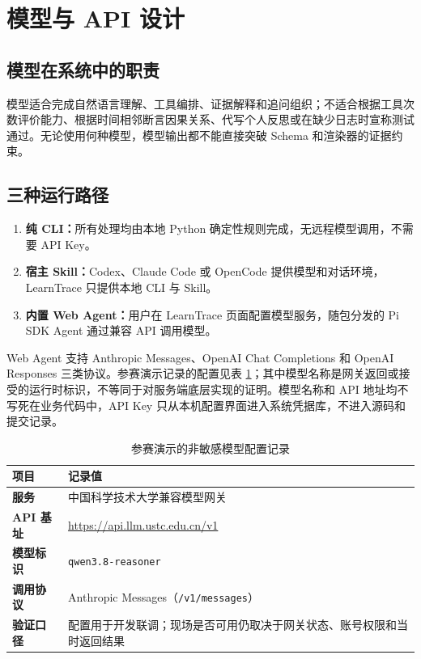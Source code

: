\documentclass[UTF8,a4paper,12pt]{ctexart}
\begin{document}
\section{模型与 API 设计}

\subsection{模型在系统中的职责}

模型适合完成自然语言理解、工具编排、证据解释和追问组织；不适合根据工具次数评价能力、根据时间相邻断言因果关系、代写个人反思或在缺少日志时宣称测试通过。无论使用何种模型，模型输出都不能直接突破 Schema 和渲染器的证据约束。

\subsection{三种运行路径}

\begin{enumerate}
  \item \textbf{纯 CLI：}所有处理均由本地 Python 确定性规则完成，无远程模型调用，不需要 API Key。
  \item \textbf{宿主 Skill：}Codex、Claude Code 或 OpenCode 提供模型和对话环境，LearnTrace 只提供本地 CLI 与 Skill。
  \item \textbf{内置 Web Agent：}用户在 LearnTrace 页面配置模型服务，随包分发的 Pi SDK Agent 通过兼容 API 调用模型。
\end{enumerate}

Web Agent 支持 Anthropic Messages、OpenAI Chat Completions 和 OpenAI Responses 三类协议。参赛演示记录的配置见表 \ref{tab:model-config}；其中模型名称是网关返回或接受的运行时标识，不等同于对服务端底层实现的证明。模型名称和 API 地址均不写死在业务代码中，API Key 只从本机配置界面进入系统凭据库，不进入源码和提交记录。

\begin{table}[h]
\centering
\small
\caption{参赛演示的非敏感模型配置记录}
\label{tab:model-config}
\begin{tabularx}{0.94\textwidth}{>{\bfseries}p{}X}
\toprule
项目 & 记录值 \\
\midrule
服务 & 中国科学技术大学兼容模型网关 \\
API 基址 & \url{https://api.llm.ustc.edu.cn/v1} \\
模型标识 & \texttt{qwen3.8-reasoner} \\
调用协议 & Anthropic Messages（\texttt{/v1/messages}） \\
验证口径 & 配置用于开发联调；现场是否可用仍取决于网关状态、账号权限和当时返回结果 \\
\bottomrule
\end{tabularx}
\end{table}
\end{document}
